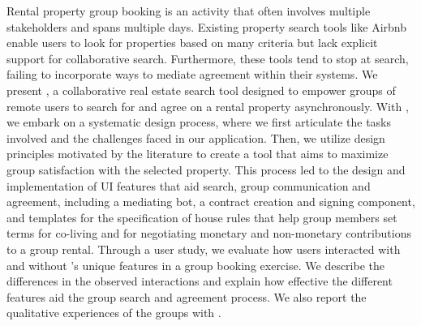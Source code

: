 
Rental property group booking is an activity that often involves multiple stakeholders and spans multiple days. Existing property search tools like Airbnb enable users to look for properties based on many criteria but lack explicit support for collaborative search. Furthermore, these tools tend to stop at search, failing to incorporate ways to mediate agreement within their systems. We present \tool, a collaborative real estate search tool designed to empower groups of remote users to search for and agree on a rental property asynchronously. With \tool, we embark on a systematic design process, where we first articulate the tasks involved and the challenges faced in our application. Then, we utilize design principles motivated by the literature to create a tool that aims to maximize group satisfaction with the selected property. This process led to the design and implementation of UI features that aid search, group communication and agreement, including a mediating bot, a contract creation and signing component, and templates for the specification of house rules that help group members set terms for co-living and for negotiating monetary and non-monetary contributions to a group rental. Through a user study, we evaluate how users interacted with and without \tool's unique features in a group booking exercise. We describe the differences in the observed interactions and explain how effective the different features aid the group search and agreement process. We also report the qualitative experiences of the groups with \tool.